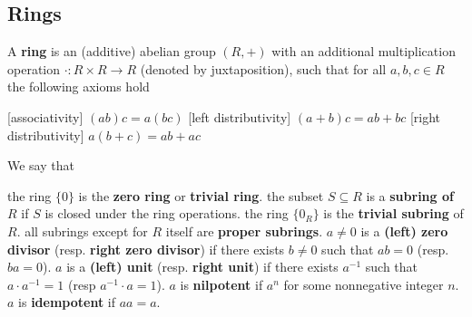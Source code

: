 \subsection{Rings}\label{subsec:rings}

\begin{definition}\label{def:ring}
  A \textbf{ring} is an (additive) abelian group \( (R, +) \) with an additional multiplication operation \( \cdot: R \times R \to R \) (denoted by juxtaposition), such that for all \( a, b, c \in R \) the following axioms hold
  \begin{description}
    [associativity] \( (ab)c = a(bc) \)
    [left distributivity] \( (a + b)c = ab + bc \)
    [right distributivity] \( a(b + c) = ab + ac \)
  \end{description}

  We say that
  \begin{itemize}
     the ring \( \{ 0 \} \) is the \textbf{zero ring} or \textbf{trivial ring}.
     the subset \( S \subseteq R \) is a \textbf{subring of \( R \)} if \( S \) is closed under the ring operations.
     the ring \( \{ 0_R \} \) is the \textbf{trivial subring} of \( R \).
     all subrings except for \( R \) itself are \textbf{proper subrings}.
     \( a \neq 0 \) is a \textbf{(left) zero divisor} (resp. \textbf{right zero divisor}) if there exists \( b \neq 0 \) such that \( ab = 0 \) (resp. \( ba = 0 \)).
     \( a \) is a \textbf{(left) unit} (resp. \textbf{right unit}) if there exists \( a^{-1} \) such that \( a \cdot a^{-1} = 1 \) (resp \( a^{-1} \cdot a = 1 \)).
     \( a \) is \textbf{nilpotent} if \( a^n \) for some nonnegative integer \( n \).
     \( a \) is \textbf{idempotent} if \( aa = a \).
  \end{itemize}


\end{definition}
